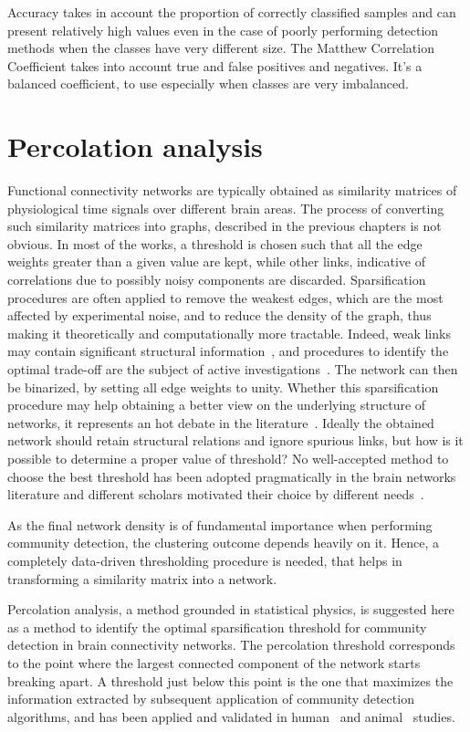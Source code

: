 \documentclass[11pt,              a4paper,              twoside,openright,              titlepage,              headinclude,footinclude,                            numbers=noenddot,              cleardoublepage=empty,]{scrreprt}
\begin{document}
Accuracy takes in account the proportion of correctly classified samples and can present relatively high values even in the case of poorly performing detection methods when the classes have very different size.
The Matthew Correlation Coefficient  takes into account true and false positives and negatives. It's a balanced coefficient, to use especially when classes are very imbalanced.


\section{Percolation analysis}\label{sec:percolation_analysis}
Functional connectivity networks are typically obtained as similarity matrices of physiological time signals over different brain areas.
The process of converting such similarity matrices into graphs, described in the previous chapters is not obvious.
In most of the works, a threshold is chosen such that all the edge weights greater than a given value are kept, while other links, indicative of correlations due to possibly noisy components are discarded.
Sparsification procedures are often applied to remove the weakest edges, which are the most affected by experimental noise, and to reduce the density of the graph, thus making it theoretically and computationally more tractable.
Indeed, weak links may contain significant structural information~\cite{thomas2011}, and procedures to identify the optimal trade-off are the subject of active investigations~\cite{zahoranszky-kohalmi2016a}.
The network can then be binarized, by setting all edge weights to unity.
Whether this sparsification procedure may help obtaining a better view on the underlying structure of networks, it represents an hot debate in the literature~\cite{rubinov2010,thomas2011}.
Ideally the obtained network should retain structural relations and ignore spurious links, but how is it possible to determine a proper value of threshold?
No well-accepted method to choose the best threshold has been adopted pragmatically in the brain networks literature and different scholars motivated their choice by different needs~\cite{gallos2012,lee2011,scheinost2012}.

As the final network density is of fundamental importance when performing community detection, the clustering outcome depends heavily on it.
Hence, a completely data-driven thresholding procedure is needed, that helps in transforming a similarity matrix into a network.


Percolation analysis, a method grounded in statistical physics, is suggested here as a method to identify the optimal sparsification threshold for community detection in brain connectivity networks.
The percolation threshold corresponds to the point where the largest connected component of the network starts breaking apart.
A threshold just below this point is the one that maximizes the information extracted by subsequent application of community detection algorithms, and has been applied and validated in human~\cite{gallos2012} and animal~\cite{bardella2016a} studies.
\end{document}
